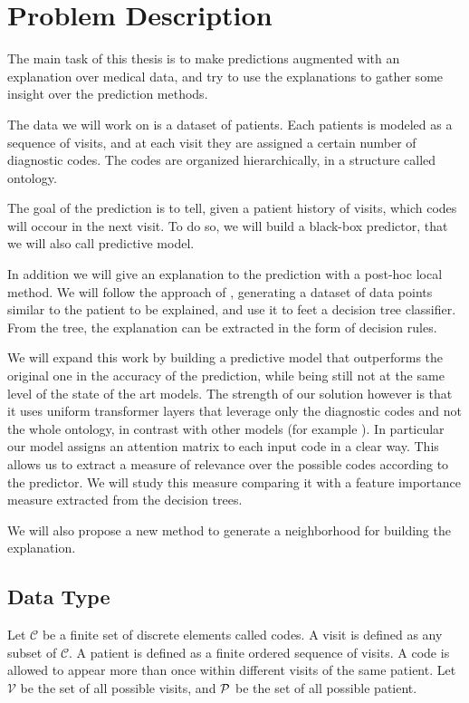 \documentclass[]{marticle}
\newcommand{\codes}{\mathcal{C}}
\newcommand{\visits}{\mathcal{V}}
\begin{document}
\section{Problem Description}

The main task of this thesis is to make predictions augmented with an explanation over medical data,
and try to use the explanations to gather some insight over the prediction methods.

The data we will work on is a dataset of patients. Each patients is modeled as a sequence of visits,
and at each visit they are assigned a certain number of diagnostic codes. The codes are organized
hierarchically, in a structure called ontology.

The goal of the prediction is to tell, given a patient history of visits, which codes will occour in
the next visit. To do so, we will build a black-box predictor, that we will also call predictive
model.

In addition we will give an explanation to the prediction with a post-hoc local method. We will
follow the approach of \cite{panigutti-xai}, generating a dataset of data points similar to the
patient to be explained, and use it to feet a decision tree classifier. From the tree, the
explanation can be extracted in the form of decision rules.

We will expand this work by building a predictive model that outperforms the original one in the
accuracy of the prediction, while being still not at the same level of the state of the art models.
The strength of our solution however is that it uses uniform transformer layers that leverage only
the diagnostic codes and not the whole ontology, in contrast with other models (for example
\cite{setor-paper}). In particular our model assigns an attention matrix to each input code in a
clear way. This allows us to extract a measure of relevance over the possible codes according to the
predictor. We will study this measure comparing it with a feature importance measure extracted from
the decision trees.

We will also propose a new method to generate a neighborhood for building the explanation.

\subsection{Data Type} \label{sect-datashape}

Let $\codes$ be a finite set of discrete elements called codes. A visit is defined as any subset
of $\codes$. A patient is defined as a finite ordered sequence of visits. A code is allowed to
appear more than once within different visits of the same patient. Let $\visits$ be the set of all
possible visits, and $\cal P$ be the set of all possible patient.
\end{document}
